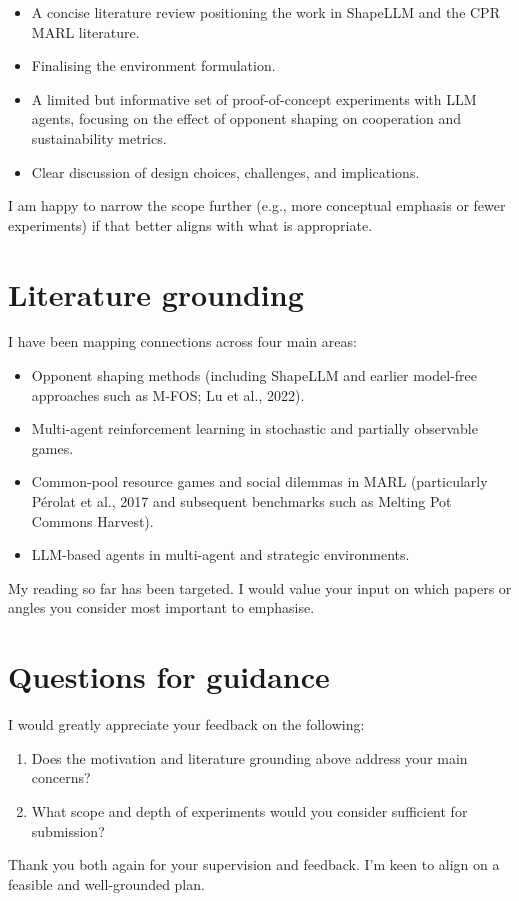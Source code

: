 \documentclass[11pt,a4paper]{article}
\begin{document}
\begin{itemize}[leftmargin=*, itemsep=0.35em]
  \item A concise literature review positioning the work in ShapeLLM and the CPR MARL literature.
  \item Finalising the environment formulation.
  \item A limited but informative set of proof-of-concept experiments with LLM agents, focusing on the effect of opponent shaping on cooperation and sustainability metrics.
  \item Clear discussion of design choices, challenges, and implications.
\end{itemize}

I am happy to narrow the scope further (e.g., more conceptual emphasis or fewer experiments) if that better aligns with what is appropriate.

\section{Literature grounding}

I have been mapping connections across four main areas:

\begin{itemize}[leftmargin=*, itemsep=0.35em]
  \item Opponent shaping methods (including ShapeLLM and earlier model-free approaches such as M-FOS; Lu et al., 2022).
  \item Multi-agent reinforcement learning in stochastic and partially observable games.
  \item Common-pool resource games and social dilemmas in MARL (particularly P\'{e}rolat et al., 2017 and subsequent benchmarks such as Melting Pot Commons Harvest).
  \item LLM-based agents in multi-agent and strategic environments.
\end{itemize}

My reading so far has been targeted. I would value your input on which papers or angles you consider most important to emphasise.

\section{Questions for guidance}

I would greatly appreciate your feedback on the following:

\begin{enumerate}[leftmargin=*, itemsep=0.35em]
  \item Does the motivation and literature grounding above address your main concerns?
  \item What scope and depth of experiments would you consider sufficient for submission?
\end{enumerate}

\vspace{1em}
Thank you both again for your supervision and feedback. I'm keen to align on a feasible and well-grounded plan.
\end{document}
